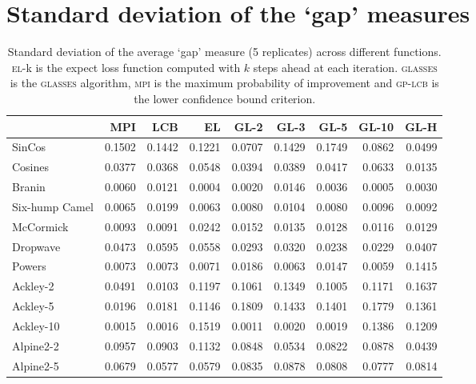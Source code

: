 \documentclass[twoside]{article}
\newcommand{\acr}[1]{\textsc{#1}\xspace}
\newcommand{\us}{\acr{glasses}}
\newcommand{\mpi}{\acr{mpi}}
\newcommand{\el}{\acr{el}}
\newcommand{\lcb}{\acr{gp-lcb}}
\begin{document}
\newpage
\section{Standard deviation of the `gap' measures}

\begin{table}[h!]
\begin{center}
\begin{tabular}{lrrrrrrrr}
\toprule
{} &     MPI &     LCB &      EL &    GL-2 &    GL-3 &    GL-5 &   GL-10 &    GL-H \\
\midrule
SinCos             &  0.1502 &  0.1442 &  0.1221 &  0.0707 &  0.1429 &  0.1749 &  0.0862 &  0.0499 \\
Cosines            &  0.0377 &  0.0368 &  0.0548 &  0.0394 &  0.0389 &  0.0417 &  0.0633 &  0.0135 \\
Branin             &  0.0060 &  0.0121 &  0.0004 &  0.0020 &  0.0146 &  0.0036 &  0.0005 &  0.0030 \\
Six-hump Camel          &  0.0065 &  0.0199 &  0.0063 &  0.0080 &  0.0104 &  0.0080 &  0.0096 &  0.0092 \\
McCormick            &  0.0093 &  0.0091 &  0.0242 &  0.0152 &  0.0135 &  0.0128 &  0.0116 &  0.0129 \\
Dropwave            &  0.0473 &  0.0595 &  0.0558 &  0.0293 &  0.0320 &  0.0238 &  0.0229 &  0.0407 \\
Powers               &  0.0073 &  0.0073 &  0.0071 &  0.0186 &  0.0063 &  0.0147 &  0.0059 &  0.1415 \\
Ackley-2 &  0.0491 &  0.0103 &  0.1197 &  0.1061 &  0.1349 &  0.1005 &  0.1171 &  0.1637 \\
Ackley-5   &  0.0196 &  0.0181 &  0.1146 &  0.1809 &  0.1433 &  0.1401 &  0.1779 &  0.1361 \\
Ackley-10 &  0.0015 &  0.0016 &  0.1519 &  0.0011 &  0.0020 &  0.0019 &  0.1386 &  0.1209 \\
Alpine2-2 &  0.0957 &  0.0903 &  0.1132 &  0.0848 &  0.0534 &  0.0822 &  0.0878 &  0.0439 \\
Alpine2-5 &  0.0679 &  0.0577 &  0.0579 &  0.0835 &  0.0878 &  0.0808 &  0.0777 &  0.0814 \\
\bottomrule
\end{tabular}\caption{Standard deviation of the average `gap' measure (5 replicates) across different functions.  \el-k is the expect loss function computed with $k$ steps ahead at each iteration. \us is the \us algorithm, \mpi is the maximum probability of improvement and \lcb is the lower confidence bound criterion.}
\end{center}
\end{table}\label{table:comparision_std}
\end{document}
